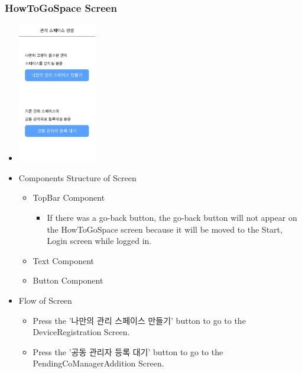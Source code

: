 \documentclass[conference]{IEEEtran}
\begin{document}
\subsubsection{HowToGoSpace Screen}
\begin{itemize}
    \item[] \includegraphics[width=0.27\textwidth]{img/D/8.png}
    \item Components Structure of Screen
    \begin{itemize}
        \item TopBar Component
        \begin{itemize}
            \item If there was a go-back button, the go-back button will not appear on the HowToGoSpace screen because it will be moved to the Start, Login screen while logged in.
        \end{itemize}
        \item Text Component
        \item Button Component
    \end{itemize}
    \item Flow of Screen
    \begin{itemize}
        \item Press the '나만의 관리 스페이스 만들기' button to go to the DeviceRegistration Screen.
        \item Press the '공동 관리자 등록 대기' button to go to the PendingCoManagerAddition Screen.
        \\
    \end{itemize}
\end{itemize}
\newpage
\end{document}
